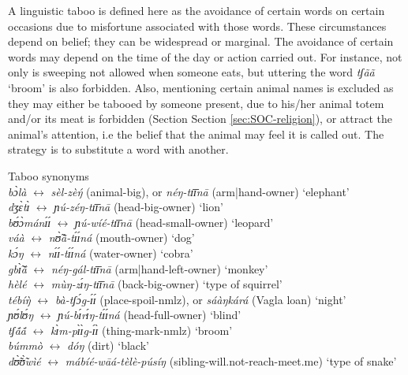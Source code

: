 \begin{exe}
\begin{exe}
\begin{exe}
{\begin{exe}
\begin{exe}
\begin{exe}
\begin{exe}
\begin{exe}
\begin{exe}
\begin{exe}
\begin{xlist}
\begin{exe}
\begin{exe}
\begin{exe}
\begin{exe}
\begin{exe}
\begin{exe}
\begin{exe}
\begin{exe}
\begin{exe}
\begin{exe}
\begin{exe}
\begin{exe}
\begin{exe}
\begin{exe}
\begin{exe}
A linguistic  taboo is defined here as the avoidance of
certain words on certain occasions due to  misfortune associated with those
words. 
These circumstances depend on belief; they can be widespread or marginal. The
avoidance of certain words may depend on the time of the day or action carried
out. For instance, not only  is sweeping  not allowed when someone eats, but
uttering the word {\it tʃãã} `broom' is also forbidden. Also, mentioning
certain animal names is excluded as they may either be tabooed by someone
present, due to his/her animal totem and/or its meat is forbidden (Section 
Section \ref{sec:SOC-religion}),  or attract the animal's attention, i.e the 
belief that the  animal may feel it is called out. The strategy is to substitute 
a word with another. 


\ea\label{ex:GRM-taboo-synonyms}{\rm Taboo synonyms}\\

 {\it bɔ̀là} $\leftrightarrow$ {\it sèl-zèŋ́} {\rm (animal-big)},  {\rm or} 
{\it néŋ-tɪ̄ɪ̄nā} {\rm (arm|hand-owner)}  {\rm `elephant'} \\
{\it dʒɛ̀tɪ̀} $\leftrightarrow$ {\it ɲú-zéŋ-tɪ̄ɪ̄nā} {\rm 
(head-big-owner)} {\rm  `lion'}\\
{\it bʊ́ɔ̀mánɪ́ɪ́} $\leftrightarrow$ {\it ɲú-wíé-tɪ̄ɪ̄nā} {\rm 
(head-small-owner)}  {\rm  `leopard'}\\
{\it váà} $\leftrightarrow$ {\it nʊ̃̀ã̀-tɪ́ɪ́ná} {\rm (mouth-owner)}  
{\rm  `dog'}\\
{\it kɔ́ŋ} $\leftrightarrow$ {\it nɪ́ɪ́-tɪ́ɪ́ná}  {\rm 
(water-owner)}  {\rm  `cobra'} \\
{\it gbɪ̃̀ã́} $\leftrightarrow$ {\it néŋ-gál-tɪ̄ɪ̄nā} {\rm 
(arm|hand-left-owner)} {\rm  `monkey'}\\
{\it hèlé} $\leftrightarrow$ {\it mùŋ-zɪ́ŋ-tɪ̄ɪ̄nā} {\rm
(back-big-owner)} {\rm  `type of squirrel'}\\
{\it tébíŋ̀} $\leftrightarrow$ {\it bà-tʃɔ́g-ɪ́ɪ́}  {\rm
(place-spoil-{\sc nmlz})},  {\rm or} {\it 
sáàŋkárá} {\rm (Vagla loan})   {\rm  `night'}\\
{\it ɲʊ́lʊ́ŋ} $\leftrightarrow$ {\it ɲú-bɪ́rɪ́ŋ-tɪ́ɪ́ná}   {\rm
(head-full-owner)} {\rm  `blind'}\\
{\it tʃã́ã́} $\leftrightarrow$ {\it kɪ̀m-pɪ̀ɪ̀g-ɪ́ɪ̀}  {\rm
(thing-mark-{\sc nmlz})}   {\rm  `broom'}\\
{\it búmmò} $\leftrightarrow$ {\it dóŋ}  {\rm  (dirt)}  {\rm  `black'}\\
{\it dʊ̃̀ʊ̃̀wìé} $\leftrightarrow$ {\it mábíé-wāá-tèlè-púsíŋ} {\rm
(sibling-will.not-reach-meet.me)}
{\rm  `type of snake'}\\


\end{exe}
\end{exe}
\end{exe}
\end{exe}
\end{exe}
\end{exe}
\end{exe}
\end{exe}
\end{exe}
\end{exe}
\end{exe}
\end{exe}
\end{exe}
\end{exe}
\end{exe}
\end{xlist}
\end{exe}
\end{exe}
\end{exe}
\end{exe}
\end{exe}
\end{exe}
\end{exe}}
\end{exe}
\end{exe}
\end{exe}
